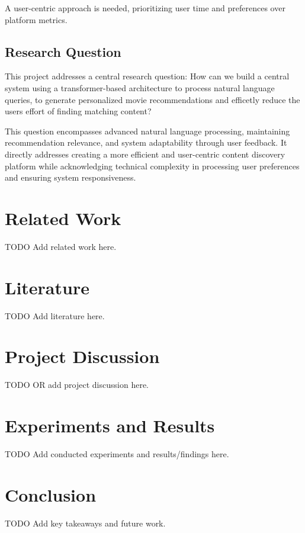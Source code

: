 \documentclass[12pt,a4paper]{article}
\begin{document}
  \noindent A user-centric approach is needed, prioritizing user time and preferences over platform metrics.

  \subsection{Research Question}

  This project addresses a central research question:
  How can we build a central system using a transformer-based architecture to process natural language queries,
  to generate personalized movie recommendations and efficetly reduce the users effort of finding matching content?

  \noindent This question encompasses advanced natural language processing, maintaining recommendation relevance, and system
  adaptability through user feedback. It directly addresses creating a more efficient and user-centric content discovery
  platform while acknowledging technical complexity in processing user preferences and ensuring system responsiveness.

  \section{Related Work}

  TODO Add related work here.

  \section{Literature}

  TODO Add literature here.

  \section{Project Discussion}

  TODO OR add project discussion here.

  \section{Experiments and Results}

  TODO Add conducted experiments and results/findings here.

  \section{Conclusion}

  TODO Add key takeaways and future work.
\end{document}
